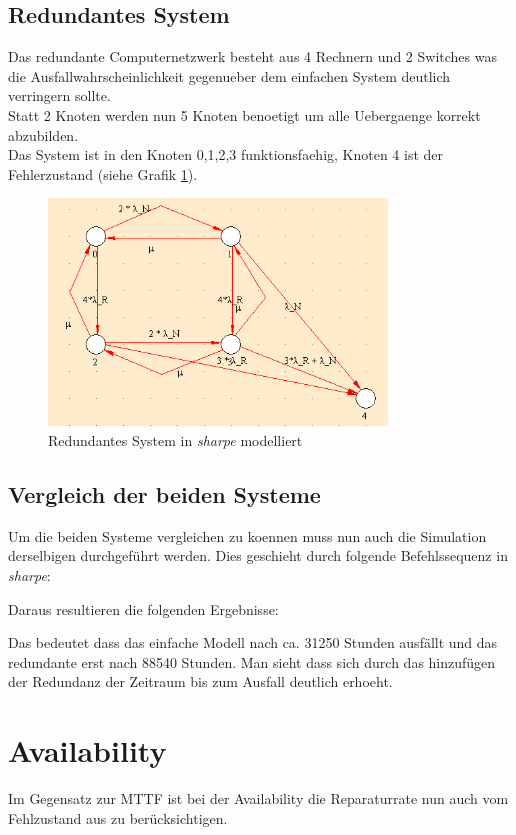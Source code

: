 \documentclass[10pt,a4paper]{article}
\begin{document}

\subsection{Redundantes System}
Das redundante Computernetzwerk besteht aus 4 Rechnern und 2 Switches was die Ausfallwahrscheinlichkeit gegenueber dem einfachen System deutlich verringern sollte.\\
Statt 2 Knoten werden nun 5 Knoten benoetigt um alle Uebergaenge korrekt abzubilden.\\
Das System ist in den Knoten 0,1,2,3 funktionsfaehig, Knoten 4 ist der Fehlerzustand (siehe Grafik \ref{mmtm_redundant}).
\begin{figure}[ht!]
\centering
\includegraphics[width=90mm]{MTTM_ReduntantesModell.png}
\caption{Redundantes System in \textit{sharpe} modelliert \label{mmtm_redundant}}
\end{figure}

\newpage
\subsection{Vergleich der beiden Systeme}
Um die beiden Systeme vergleichen zu koennen muss nun auch die Simulation derselbigen durchgeführt werden. Dies geschieht durch folgende Befehlssequenz in \textit{sharpe}:


Daraus resultieren die folgenden Ergebnisse: 

Das bedeutet dass das einfache Modell nach ca. 31250 Stunden ausfällt und das redundante erst nach 88540 Stunden. Man sieht dass sich durch das hinzufügen der Redundanz der Zeitraum bis zum Ausfall deutlich erhoeht. 
\section{Availability}
Im Gegensatz zur MTTF ist bei der Availability die Reparaturrate nun auch vom Fehlzustand aus zu berücksichtigen.
\end{document}
